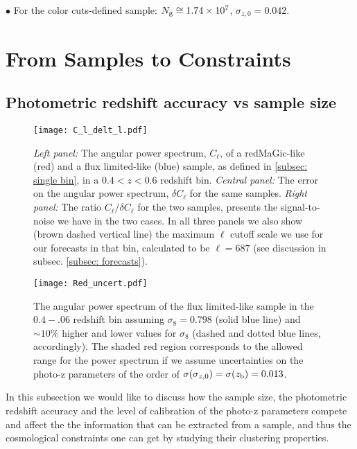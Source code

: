 \documentclass[a4paper,fleqn,usenatbib]{mnras}
\begin{document}
$\bullet$ For the color cuts-defined sample: $N_{\mbox{\scriptsize{g}}} \cong 1.74 \times 10^7$, $\sigma_{z,0} = 0.042$.



\section{From Samples to Constraints}
\label{sec: Samples_Constraints}

\subsection{Photometric redshift accuracy vs sample size}


\begin{figure*}
\centering
\texttt{[image: C\_l\_delt\_l.pdf]} 
\caption{\textit{Left panel:} The angular power spectrum, $C_\ell$, of a redMaGic-like (red)  and a flux limited-like (blue) sample, as defined in \ref{subsec: single bin}, in a $0.4 < z <0.6$ redshift bin. \textit{Central panel:} The error on the angular power spectrum, $\delta C_\ell$ for the same samples. \textit{Right panel:} The ratio $C_\ell/\delta C_\ell$ for the two samples, presents the signal-to-noise we have in the two cases. In all three panels we also show (brown dashed vertical line) the maximum $\ell$ cutoff scale we use for our forecasts in that bin,  calculated to be $\ell = 687$ (see discussion in subsec. \ref{subsec: forecasts}).}
\label{fig: APS_and_Error}
\end{figure*}



\begin{figure}
\centering
\texttt{[image: Red\_uncert.pdf]} 
\caption{The angular power spectrum of the flux limited-like sample in the $0.4-.06$ redshift bin assuming $\sigma_8 = 0.798$ (solid blue line) and $\sim10\%$ higher and lower values for $\sigma_8$ (dashed and dotted blue lines, accordingly). The shaded red region corresponds to the allowed range for the power spectrum if we assume uncertainties on the photo-z parameters of the order of   $\sigma(\sigma_{z,0}) = \sigma(z_{\mbox{\scriptsize{b}}}) = 0.013$.}
\label{fig: red_uncert_eff}
\end{figure}

In this subsection we would like to discuss how the sample size, the photometric redshift accuracy and the level of calibration of the photo-z parameters compete and affect the the information that can be extracted from a sample, and thus the cosmological constraints one can get by studying their clustering properties.
\end{document}
